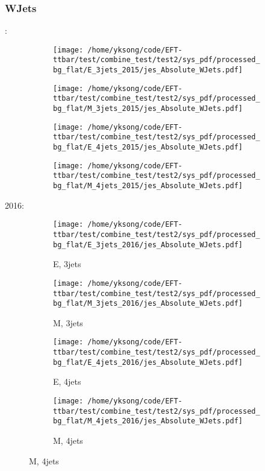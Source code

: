 \documentclass{beamer}
\begin{document}
\begin{frame}
\frametitle{WJets}
\fontsize{5}{1}:
\begin{figure}
\centering
\begin{subfigure}[b]{0.24\textwidth}
\texttt{[image: /home/yksong/code/EFT-ttbar/test/combine\_test/test2/sys\_pdf/processed\_bg\_flat/E\_3jets\_2015/jes\_Absolute\_WJets.pdf]}
\end{subfigure}
\begin{subfigure}[b]{0.24\textwidth}
\texttt{[image: /home/yksong/code/EFT-ttbar/test/combine\_test/test2/sys\_pdf/processed\_bg\_flat/M\_3jets\_2015/jes\_Absolute\_WJets.pdf]}
\end{subfigure}
\begin{subfigure}[b]{0.24\textwidth}
\texttt{[image: /home/yksong/code/EFT-ttbar/test/combine\_test/test2/sys\_pdf/processed\_bg\_flat/E\_4jets\_2015/jes\_Absolute\_WJets.pdf]}
\end{subfigure}
\begin{subfigure}[b]{0.24\textwidth}
\texttt{[image: /home/yksong/code/EFT-ttbar/test/combine\_test/test2/sys\_pdf/processed\_bg\_flat/M\_4jets\_2015/jes\_Absolute\_WJets.pdf]}
\end{subfigure}
\end{figure}
2016:
\begin{figure}
\centering
\begin{subfigure}[b]{0.24\textwidth}
\texttt{[image: /home/yksong/code/EFT-ttbar/test/combine\_test/test2/sys\_pdf/processed\_bg\_flat/E\_3jets\_2016/jes\_Absolute\_WJets.pdf]}
\captionsetup{font=tiny}
\caption{E, 3jets}
\end{subfigure}
\begin{subfigure}[b]{0.24\textwidth}
\texttt{[image: /home/yksong/code/EFT-ttbar/test/combine\_test/test2/sys\_pdf/processed\_bg\_flat/M\_3jets\_2016/jes\_Absolute\_WJets.pdf]}
\captionsetup{font=tiny}
\caption{M, 3jets}
\end{subfigure}
\begin{subfigure}[b]{0.24\textwidth}
\texttt{[image: /home/yksong/code/EFT-ttbar/test/combine\_test/test2/sys\_pdf/processed\_bg\_flat/E\_4jets\_2016/jes\_Absolute\_WJets.pdf]}
\captionsetup{font=tiny}
\caption{E, 4jets}
\end{subfigure}
\begin{subfigure}[b]{0.24\textwidth}
\texttt{[image: /home/yksong/code/EFT-ttbar/test/combine\_test/test2/sys\_pdf/processed\_bg\_flat/M\_4jets\_2016/jes\_Absolute\_WJets.pdf]}
\captionsetup{font=tiny}
\caption{M, 4jets}
\end{subfigure}
\end{figure}
\end{frame}
\end{document}
